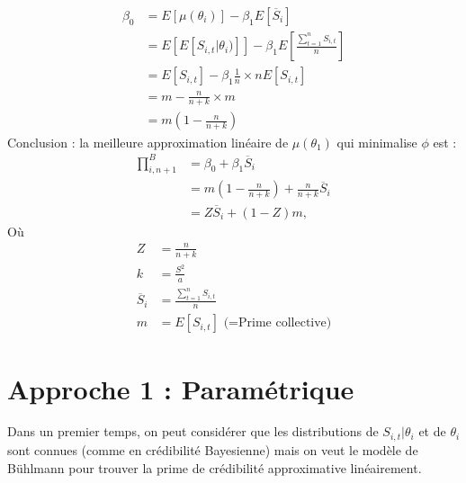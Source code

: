 \documentclass[11pt,french]{report}
\begin{document}
\begin{align*}
\beta_0 &= E[\mu(\theta_i)] - \beta_1 E[\overline{S}_i] \\
&= E[E[S_{i,t}|\theta_i)]] - \beta_1 E[\frac{\sum_{t=1}^{n} S_{i,t}}{n}] \\
&= E[S_{i,t}] - \beta_1 \frac{1}{n} \times n E[S_{i,t}] \\
&= m - \frac{n}{n+k} \times m \\
&= m (1 - \frac{n}{n+k})
\end{align*}
Conclusion : la meilleure approximation linéaire de $\mu(\theta_1)$ qui minimalise $\phi$ est :
\begin{align*}
\prod_{i,n+1}^{B} &= \beta_0 + \beta_1 \overline{S}_i \\
&= m (1 - \frac{n}{n+k}) +  \frac{n}{n+k} \overline{S}_i \\
&= Z \overline{S}_i + (1 -Z)m,
\end{align*}
Où 
\begin{align*}
Z &=  \frac{n}{n+k} \\
k &= \frac{S^2}{a}\\
\overline{S}_i &= \frac{\sum_{t=1}^{n} S_{i,t}}{n} \\
m &= E[S_{i,t}]  \text{ (=Prime collective)}
\end{align*}

\section{Approche 1 : Paramétrique}
Dans un premier temps, on peut considérer que les distributions de $S_{i,t}|\theta_i$ et de $\theta_i$ sont connues (comme en crédibilité Bayesienne) mais on veut le modèle de Bühlmann pour trouver la prime de crédibilité approximative linéairement.
\end{document}
